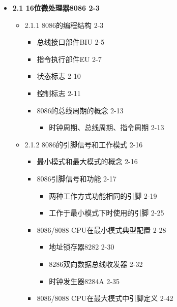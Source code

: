 \documentclass[zihao=5,linespread=1,heading=false,autoindent=0pt]{ctexart}
\newenvironment{citemize}%
{\begin{itemize}[parsep=0pt,itemsep=0pt,topsep=0pt,partopsep=0pt,labelwidth=1em,leftmargin=*]}
{\end{itemize}}
\theoremstyle{exampstyle} \newtheorem{definition}{定义}[section]
\theoremstyle{exampstyle} \newtheorem{example}{例}[section]
\theoremstyle{exampstyle} \newtheorem{theorem}{定理}[section]
\theoremstyle{exampstyle} \newtheorem{lemma}{引理}[section]
\theoremstyle{exampstyle} \newtheorem{myproof}{证明}[section]
\begin{document}
\begin{multicols*}{3}
    \begin{citemize}
     
    \item
      \textbf{2.1 16位微处理器8086 2-3}
    
      \begin{citemize}
       
      \item
        2.1.1 8086的编程结构 2-3
    
        \begin{citemize}
         
        \item
          总线接口部件BIU 2-5
        \item
          指令执行部件EU 2-7
        \item
          状态标志 2-10
        \item
          控制标志 2-11
        \item
          8086的总线周期的概念 2-13
    
          \begin{citemize}
           
          \item
            时钟周期、总线周期、指令周期 2-13
          \end{citemize}
        \end{citemize}
      \item
        2.1.2 8086的引脚信号和工作模式 2-16
    
        \begin{citemize}
         
        \item
          最小模式和最大模式的概念 2-16
        \item
          8086引脚信号和功能 2-17
    
          \begin{citemize}
           
          \item
            两种工作方式功能相同的引脚 2-19
          \item
            工作于最小模式下时使用的引脚 2-25
          \end{citemize}
        \item
          8086/8088 CPU在最小模式典型配置 2-28
    
          \begin{citemize}
           
          \item
            地址锁存器8282 2-30
          \item
            8286双向数据总线收发器 2-32
          \item
            时钟发生器8284A 2-35
          \end{citemize}
        \item
          8086/8088 CPU在最大模式中引脚定义 2-42
    

\end{citemize}
\end{citemize}
\end{citemize}
\end{multicols*}
\end{document}
